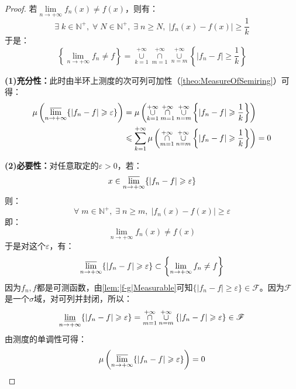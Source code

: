 \begin{proof}
	若$\lim\limits_{n\to+\infty}f_n(x)\ne f(x)$，则有：
	\begin{equation*}
		\exists\;k\in\mathbb{N}^+,\;\forall\;N\in\mathbb{N}^+,\;\exists\;n\geqslant N,\;|f_n(x)-f(x)|\geqslant\frac{1}{k}
	\end{equation*}
	于是：
	\begin{equation*}
		\left\{\lim_{n\to+\infty}f_n\ne f\right\}=\underset{k=1}{\overset{+\infty}{\cup}}\underset{m=1}{\overset{+\infty}{\cap}}\underset{n=m}{\overset{+\infty}{\cup}}\left\{|f_n-f|\geqslant\frac{1}{k}\right\}
	\end{equation*}\par
	\textbf{(1)充分性：}此时由半环上测度的次可列可加性（\cref{theo:MeasureOfSemiring}）可得：
	\begin{align*}
		\mu\left(\varlimsup_{n\to+\infty}\{|f_n-f|\geqslant\varepsilon\}\right)
		&=\mu\left(\underset{k=1}{\overset{+\infty}{\cup}}\underset{m=1}{\overset{+\infty}{\cap}}\underset{n=m}{\overset{+\infty}{\cup}}\left\{|f_n-f|\geqslant\frac{1}{k}\right\}\right) \\
		&\leqslant\sum_{k=1}^{+\infty}\mu\left(\underset{m=1}{\overset{+\infty}{\cap}}\underset{n=m}{\overset{+\infty}{\cup}}\left\{|f_n-f|\geqslant\frac{1}{k}\right\}\right)=0
	\end{align*}\par
	\textbf{(2)必要性：}对任意取定的$\varepsilon>0$，若：
	\begin{equation*}
		x\in\varlimsup_{n\to+\infty}\{|f_n-f|\geqslant\varepsilon\}
	\end{equation*}
	则：
	\begin{equation*}
		\forall\;m\in\mathbb{N}^+,\;\exists\;n\geqslant m,\;|f_n(x)-f(x)|\geqslant \varepsilon
	\end{equation*}
	即：
	\begin{equation*}
		\lim_{n\to+\infty}f_n(x)\ne f(x)
	\end{equation*}
	于是对这个$\varepsilon$，有：
	\begin{equation*}
		\varlimsup_{n\to+\infty}\{|f_n-f|\geqslant\varepsilon\}\subset\left\{\lim_{n\to+\infty}f_n\ne f\right\}
	\end{equation*}
	因为$f_n,f$都是可测函数，由\cref{lem:|f-g|Measurable}可知$\{|f_n-f|\geqslant\varepsilon\}\in\mathscr{F}$。因为$\mathscr{F}$是一个$\sigma$域，对可列并封闭，所以：
	\begin{equation*}
		\varliminf_{n\to+\infty}\{|f_n-f|\geqslant\varepsilon\}=\underset{m=1}{\overset{+\infty}{\cap}}\underset{n=m}{\overset{+\infty}{\cup}}\{|f_n-f|\geqslant\varepsilon\}\in \mathscr{F}
	\end{equation*}
	由测度的单调性可得：
	\begin{equation*}
		\mu\left(\varlimsup_{n\to+\infty}\{|f_n-f|\geqslant\varepsilon\}\right)=0\qedhere
	\end{equation*}
\end{proof}
